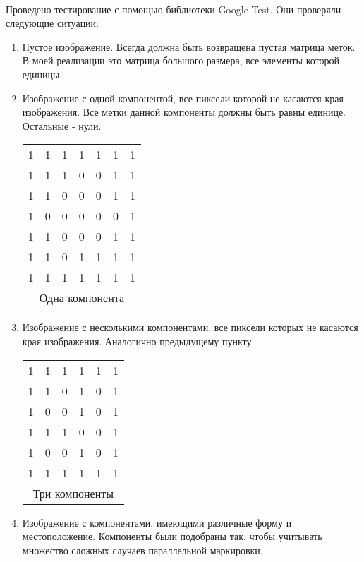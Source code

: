 \documentclass[14pt]{extarticle}
\begin{document}
\paragraph{} Проведено тестирование с помощью библиотеки Google Test. Они проверяли следующие ситуации:
\begin{enumerate}
    \item Пустое изображение. Всегда должна быть возвращена пустая матрица меток. В моей реализации это матрица большого размера, все элементы которой единицы.
    \item Изображение с одной компонентой, все пиксели которой не касаются края изображения. Все метки данной компоненты должны быть равны единице. Остальные - нули. 
    \\\begin{center}\begin{tabular}{ |c c c c c c c| }
    \hline
     1 & 1 & 1 & 1 & 1 & 1 & 1\\  
     1 & 1 & 1 & 0 & 0&1&1\\  
     1 & 1 & 0 & 0 & 0&1&1\\  
     1 & 0 & 0 & 0 & 0&0&1\\   
     1 & 1 &0 & 0 & 0&1&1\\
     1&1&0&1&1&1&1\\
     1&1&1&1&1&1&1\\
     \hline
     \multicolumn{7}{c}{Одна компонента}
    \end{tabular}
    \end{center}
    \item Изображение с несколькими компонентами, все пиксели которых не касаются края изображения. Аналогично предыдущему пункту.
    \\\begin{center}\begin{tabular}{ |c c c c c c | }
    \hline
     1 & 1 & 1 & 1 & 1 & 1\\  
     1 & 1 & 0 & 1 & 0&1\\  
     1 & 0 & 0 & 1 & 0&1\\  
     1 & 1 & 1 & 0 & 0&1\\   
     1 & 0 &0 & 1 & 0&1\\
     1&1&1&1&1&1\\
     \hline
     \multicolumn{6}{c}{Три компоненты}
    \end{tabular}
    \end{center}
    \item Изображение с компонентами, имеющими различные форму и местоположение. Компоненты были подобраны так, чтобы учитывать множество сложных случаев параллельной маркировки.

\end{enumerate}
\end{document}
